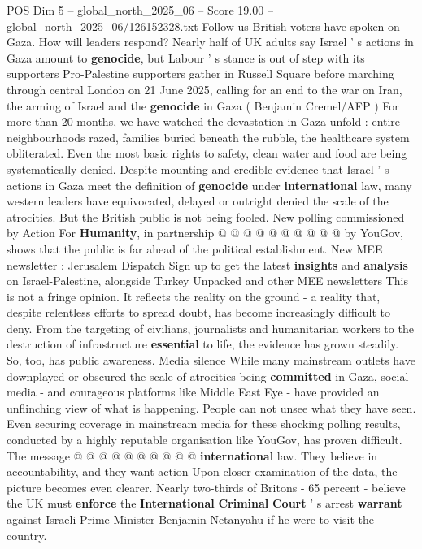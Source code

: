 \begin{textsample}{POS Dim 5 – global\_north\_2025\_06 – Score 19.00 – global\_north\_2025\_06/126152328.txt}  \label{ex:f5_pos_066}
Follow us British voters have spoken on Gaza.
How will leaders respond?
Nearly half of UK adults say Israel ' s actions in Gaza amount to \textbf{genocide}, but Labour ' s stance is out of step with its supporters Pro-Palestine supporters gather in Russell Square before marching through central London on 21 June 2025, calling for an end to the war on Iran, the arming of Israel and the \textbf{genocide} in Gaza ( Benjamin Cremel/AFP ) For more than 20 months, we have watched the devastation in Gaza unfold : entire neighbourhoods razed, families buried beneath the rubble, the healthcare system obliterated.
Even the most basic rights to safety, clean water and food are being systematically denied.
Despite mounting and credible evidence that Israel ' s actions in Gaza meet the definition of \textbf{genocide} under \textbf{international} law, many western leaders have equivocated, delayed or outright denied the scale of the atrocities.
But the British public is not being fooled.
New polling commissioned by Action For \textbf{Humanity}, in partnership @ @ @ @ @ @ @ @ @ @ by YouGov, shows that the public is far ahead of the political establishment.
New MEE newsletter : Jerusalem Dispatch Sign up to get the latest \textbf{insights} and \textbf{analysis} on Israel-Palestine, alongside Turkey Unpacked and other MEE newsletters This is not a fringe opinion.
It reflects the reality on the ground - a reality that, despite relentless efforts to spread doubt, has become increasingly difficult to deny.
From the targeting of civilians, journalists and humanitarian workers to the destruction of infrastructure \textbf{essential} to life, the evidence has grown steadily.
So, too, has public awareness.
Media silence While many mainstream outlets have downplayed or obscured the scale of atrocities being \textbf{committed} in Gaza, social media - and courageous platforms like Middle East Eye - have provided an unflinching view of what is happening.
People can not unsee what they have seen.
Even securing coverage in mainstream media for these shocking polling results, conducted by a highly reputable organisation like YouGov, has proven difficult.
The message @ @ @ @ @ @ @ @ @ @ \textbf{international} law.
They believe in accountability, and they want action Upon closer examination of the data, the picture becomes even clearer.
Nearly two-thirds of Britons - 65 percent - believe the UK must \textbf{enforce} the \textbf{International} \textbf{Criminal} \textbf{Court} ' s arrest \textbf{warrant} against Israeli Prime Minister Benjamin Netanyahu if he were to visit the country.

\end{textsample}
